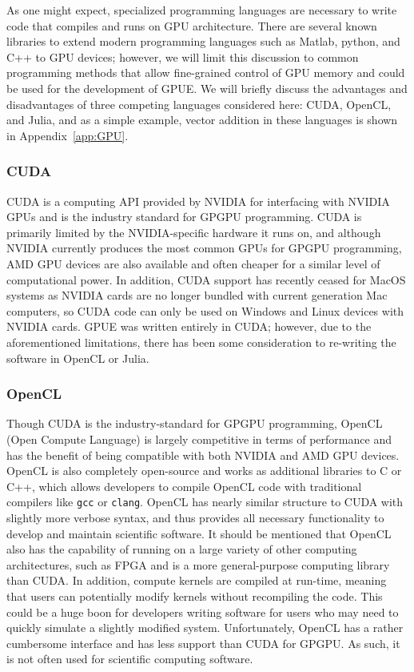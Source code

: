 As one might expect, specialized programming languages are necessary to write code that compiles and runs on GPU architecture.
There are several known libraries to extend modern programming languages such as Matlab, python, and C++ to GPU devices; however, we will limit this discussion to common programming methods that allow fine-grained control of GPU memory and could be used for the development of GPUE.
We will briefly discuss the advantages and disadvantages of three competing languages considered here: CUDA, OpenCL, and Julia, and as a simple example, vector addition in these languages is shown in  Appendix~\ref{app:GPU}.

\subsubsection{CUDA}
CUDA is a computing API provided by NVIDIA for interfacing with NVIDIA GPUs and is the industry standard for GPGPU programming.
CUDA is primarily limited by the NVIDIA-specific hardware it runs on, and although NVIDIA currently produces the most common GPUs for GPGPU programming, AMD GPU devices are also available and often cheaper for a similar level of computational power.
In addition, CUDA support has recently ceased for MacOS systems as NVIDIA cards are no longer bundled with current generation Mac computers, so CUDA code can only be used on Windows and Linux devices with NVIDIA cards.
GPUE was written entirely in CUDA; however, due to the aforementioned limitations, there has been some consideration to re-writing the software in OpenCL or Julia.

\subsubsection{OpenCL}

Though CUDA is the industry-standard for GPGPU programming, OpenCL (Open Compute Language) is largely competitive in terms of performance and has the benefit of being compatible with both NVIDIA and AMD GPU devices.
OpenCL is also completely open-source and works as additional libraries to C or C++, which allows developers to compile OpenCL code with traditional compilers like \texttt{gcc} or \texttt{clang}.
OpenCL has nearly similar structure to CUDA with slightly more verbose syntax, and thus provides all necessary functionality to develop and maintain scientific software.
It should be mentioned that OpenCL also has the capability of running on a large variety of other computing architectures, such as FPGA and is a more general-purpose computing library than CUDA.
In addition, compute kernels are compiled at run-time, meaning that users can potentially modify kernels without recompiling the code.
This could be a huge boon for developers writing software for users who may need to quickly simulate a slightly modified system.
Unfortunately, OpenCL has a rather cumbersome interface and has less support than CUDA for GPGPU.
As such, it is not often used for scientific computing software.

